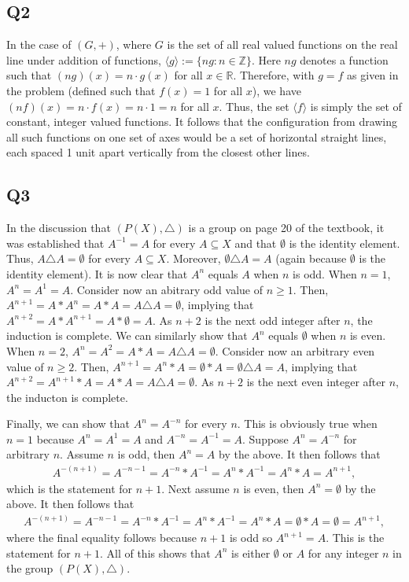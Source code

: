 \documentclass[12pt]{article}
\def\Z{{\mathbb Z}}        %
\def\R{{\mathbb R}}        %
\numberwithin{theorem}{section}
\numberwithin{equation}{section}
\numberwithin{remark}{section}
\numberwithin{definition}{section}
\numberwithin{theorem}{section}
\numberwithin{lemma}{section}
\numberwithin{example}{section}
\begin{document}
\subsection{Q2}

In the case of $(G,+)$, where $G$ is the set of all real valued functions on the real line under addition of functions, $\langle g \rangle:=\{ng:n\in\Z\}$. Here $ng$ denotes a function such that $(ng)(x) = n\cdot g(x)$ for all $x\in\R$.  Therefore, with $g=f$ as given in the problem (defined such that $f(x)=1$ for all $x$), we have $(nf)(x)=n\cdot f(x)=n\cdot1=n$ for all $x$. Thus, the set $\langle f \rangle$ is simply the set of constant, integer valued functions. It follows that the configuration from drawing all such functions on one set of axes would be a set of horizontal straight lines, each spaced 1 unit apart vertically from the closest other lines. 



\subsection{Q3}

In the discussion that $\left(P(X),\triangle\right)$ is a group on page 20 of the textbook, it was established that $A^{-1}=A$ for every $A\subseteq X$ and that $\emptyset$ is the identity element. Thus, $A\triangle A = \emptyset$ for every $A\subseteq X$. Moreover, $\emptyset\triangle A = A$ (again because $\emptyset$ is the identity element). It is now clear that $A^n$ equals $A$ when $n$ is odd. When $n=1$, $A^n=A^1=A$. Consider now an abitrary odd value of $n\ge1$. Then, $A^{n+1}=A*A^n=A*A=A\triangle A = \emptyset$, implying that $A^{n+2}=A*A^{n+1}=A*\emptyset=A$. As $n+2$ is the next odd integer after $n$, the induction is complete. We can similarly show that $A^n$ equals $\emptyset$ when $n$ is even. When $n=2$, $A^n=A^2=A*A=A\triangle A = \emptyset$. Consider now an arbitrary even value of $n\ge 2$. Then, $A^{n+1}=A^n*A=\emptyset*A=\emptyset\triangle A=A$, implying that $A^{n+2}=A^{n+1}*A=A*A=A\triangle A=\emptyset$. As $n+2$ is the next even integer after $n$, the inducton is complete. 

Finally, we can show that $A^n=A^{-n}$ for every $n$. This is obviously true when $n=1$ because $A^n=A^1=A$ and $A^{-n}=A^{-1}=A$. Suppose $A^n=A^{-n}$ for arbitrary $n$. Assume $n$ is odd, then $A^n=A$ by the above. It then follows that
\begin{align*}
	A^{-(n+1)}=A^{-n-1}=A^{-n}*A^{-1}=A^n*A^{-1}=A^n*A=A^{n+1},
\end{align*}
which is the statement for $n+1$. Next assume $n$ is even, then $A^n=\emptyset$ by the above. It then follows that 
\begin{align*}
	A^{-(n+1)}=A^{-n-1}=A^{-n}*A^{-1}=A^n*A^{-1}=A^n*A=\emptyset*A=\emptyset = A^{n+1},
\end{align*}
where the final equality follows because $n+1$ is odd so $A^{n+1}=A$. This is the statement for $n+1$. All of this shows that $A^n$ is either $\emptyset$ or $A$ for any integer $n$ in the group $\left(P(X),\triangle\right)$. 
\end{document}
